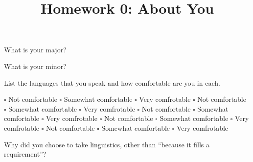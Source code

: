 \documentclass[addpoints]{exam}
\title{Homework 0: About You}
\date{}
\begin{document}
  \maketitle

  


  \begin{questions}
    \parbox[t]{0.45\linewidth}{
      \question What is your major? \hrulefill
    }
    \hspace{0.1\linewidth}
    \parbox[t]{0.45\linewidth}{
      \question What is your minor? \hrulefill
    }
    \question List the languages that you speak and how comfortable are you in each.

    \begin{oneparchoices}
      \choice \hrulefill $\square$ Not comfortable $\square$ Somewhat comfortable $\square$ Very comfrotable
      \choice \hrulefill $\square$ Not comfortable $\square$ Somewhat comfortable $\square$ Very comfrotable
      \choice \hrulefill $\square$ Not comfortable $\square$ Somewhat comfortable $\square$ Very comfrotable
      \choice \hrulefill $\square$ Not comfortable $\square$ Somewhat comfortable $\square$ Very comfrotable
      \choice \hrulefill $\square$ Not comfortable $\square$ Somewhat comfortable $\square$ Very comfrotable
    \end{oneparchoices}

    \question Why did you choose to take linguistics, other than ``because it fills a requirement''?

    \hrulefill

    \hrulefill

    \hrulefill

    \hrulefill

    \hrulefill
  \end{questions}
\end{document}

